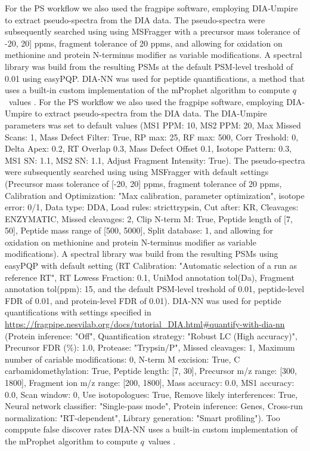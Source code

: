 \documentclass[10pt,letterpaper]{article}
\begin{document}

For the PS workflow we also used the fragpipe software, employing DIA-Umpire to extract pseudo-spectra from the DIA data. The pseudo-spectra were subsequently searched using using MSFragger with a precursor mass tolerance of -20, 20] ppms, fragment tolerance of 20 ppms, and allowing for oxidation on methionine and protein N-terminus modifier as variable modifications.  A spectral library was build from the resulting PSMs at the default PSM-level treshold of 0.01 using easyPQP. DIA-NN was used for peptide quantifications, a method that uses a built-in custom implementation of the mProphet algorithm to compute $q$~values \cite{reiter2011mprophet, demichev2020dia}.
For the PS workflow we also used the fragpipe software, employing DIA-Umpire to extract pseudo-spectra from the DIA data. The DIA-Umpire parameters was set to default values (MS1 PPM: 10, MS2 PPM: 20, Max Missed Scans: 1, Mass Defect Filter: True, RP max: 25, RF max: 500, Corr Treshold: 0, Delta Apex: 0.2, RT Overlap 0.3, Mass Defect Offset 0.1, Isotope Pattern: 0.3, MS1 SN: 1.1, MS2 SN: 1.1, Adjust Fragment Intensity: True). The pseudo-spectra were subsequently searched using using MSFragger with default settings (Precursor mass tolerance of [-20, 20] ppms, fragment tolerance of 20 ppms, Calibration and Optimization: "Max calibration, parameter optimization", isotope error: 0/1, Data type: DDA, Load rules: stricttrypsin, Cut after: KR, Cleavages: ENZYMATIC, Missed cleavages: 2, Clip N-term M: True, Peptide length of [7, 50], Peptide mass range of [500, 5000], Split database: 1, and allowing for oxidation on methionine and protein N-terminus modifier as variable modifications).  A spectral library was build from the resulting PSMs using easyPQP with default setting (RT Calibration: "Automatic selection of a run as reference RT", RT Lowess Fraction: 0.1, UniMod annotation tol(Da), Fragment annotation tol(ppm): 15, and the default PSM-level treshold of 0.01, peptide-level FDR of 0.01, and protein-level FDR of 0.01). DIA-NN was used for peptide quantifications with settings specified in \url{https://fragpipe.nesvilab.org/docs/tutorial_DIA.html#quantify-with-dia-nn} (Protein inference: "Off", Quantification strategy: "Robust LC (High accuracy)", Precursor FDR (\%): 1.0, Protease: "Trypsin/P", Missed cleavages: 1, Maximum number of cariable modifications: 0, N-term M excision: True, C carbamidomethylation: True, Peptide length: [7, 30], Precursor m/z range: [300, 1800], Fragment ion m/z range: [200, 1800], Mass accuracy: 0.0, MS1 accuracy: 0.0, Scan window: 0, Use isotopologues: True, Remove likely interferences: True, Neural network classifier: "Single-pass mode", Protein inference: Genes, Cross-run normalization: "RT-dependent", Library generation: "Smart profiling"). Too comppute false discover rates DIA-NN uses a built-in custom implementation of the mProphet algorithm to compute $q$~values \cite{reiter2011mprophet, demichev2020dia}.
 
\end{document}
